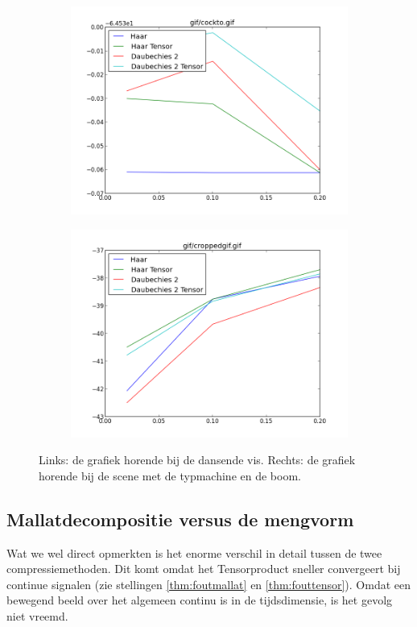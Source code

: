 \begin{figure}[h]
\centering
\begin{subfigure}[t]{0.48\textwidth}
\includegraphics[width=\linewidth]{plaatjes/cockto.png}
\end{subfigure}
\begin{subfigure}[t]{0.48\textwidth}
\includegraphics[width=\linewidth]{plaatjes/croppedgif.png}
\end{subfigure}
\caption{Links: de grafiek horende bij de dansende vis. Rechts: de grafiek horende bij de scene met de typmachine en de boom.}
\label{fig:cockto}
\end{figure}

\subsection{Mallatdecompositie versus de mengvorm}
Wat we wel direct opmerkten is het enorme verschil in detail tussen de twee compressiemethoden. Dit komt omdat het Tensorproduct sneller convergeert bij continue signalen (zie stellingen \ref{thm:foutmallat} en \ref{thm:fouttensor}). Omdat een bewegend beeld over het algemeen continu is in de tijdsdimensie, is het gevolg niet vreemd.

